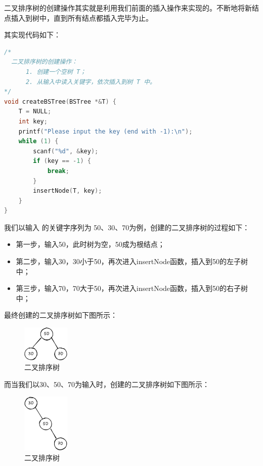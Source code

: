 \documentclass[lang=cn,newtx,10pt,scheme=chinese]{../elegantbook}
\begin{document}
二叉排序树的创建操作其实就是利用我们前面的插入操作来实现的。不断地将新结点插入到树中，直到所有结点都插入完毕为止。

其实现代码如下：

\begin{lstlisting}[language=C++, caption={二叉排序树的创建操作}]
  /*
  二叉排序树的创建操作：
      1. 创建一个空树 T；
      2. 从输入中读入关键字，依次插入到树 T 中。
*/
void createBSTree(BSTree *&T) {
    T = NULL;
    int key;
    printf("Please input the key (end with -1):\n");
    while (1) {
        scanf("%d", &key);
        if (key == -1) {
            break;
        }
        insertNode(T, key);
    }
}
\end{lstlisting}

我们以输入 的关键字序列为 50、30、70为例，创建的二叉排序树的过程如下：

\begin{itemize}
  \item 第一步，输入50，此时树为空，50成为根结点；
  \item 第二步，输入30，30小于50，再次进入insertNode函数，插入到50的左子树中；
  \item 第三步，输入70，70大于50，再次进入insertNode函数，插入到50的右子树中；
  \end{itemize}
最终创建的二叉排序树如下图所示：

\begin{figure}[!htbp]
  \centering
  \includegraphics[width=0.2\textwidth]{./figure/pdf/cropped/bsTree.pdf}
  \caption{二叉排序树}
  \label{fig:bstree}
\end{figure}

而当我们以30、50、70为输入时，创建的二叉排序树如下图所示：

\begin{figure}[!htbp]
  \centering
  \includegraphics[width=0.2\textwidth]{./figure/pdf/cropped/bsTree2.pdf}
  \caption{二叉排序树}
  \label{fig:bstree2}
\end{figure}
\end{document}
